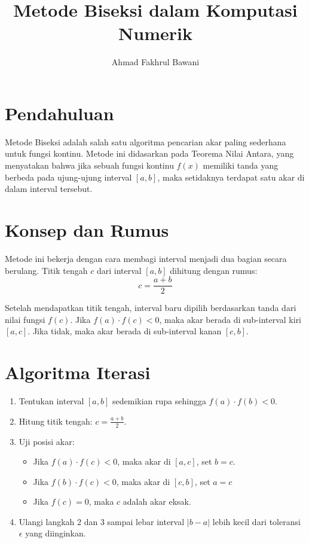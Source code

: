 \documentclass[12pt,a4paper]{article}
\title{Metode Biseksi dalam Komputasi Numerik}
\author{Ahmad Fakhrul Bawani}
\date{}
\begin{document}
\maketitle

\section{Pendahuluan}
Metode Biseksi adalah salah satu algoritma pencarian akar paling sederhana untuk fungsi kontinu. Metode ini didasarkan pada Teorema Nilai Antara, yang menyatakan bahwa jika sebuah fungsi kontinu $f(x)$ memiliki tanda yang berbeda pada ujung-ujung interval $[a, b]$, maka setidaknya terdapat satu akar di dalam interval tersebut.

\section{Konsep dan Rumus}
Metode ini bekerja dengan cara membagi interval menjadi dua bagian secara berulang. Titik tengah $c$ dari interval $[a, b]$ dihitung dengan rumus:
\begin{equation}
c = \frac{a + b}{2}
\end{equation}

Setelah mendapatkan titik tengah, interval baru dipilih berdasarkan tanda dari nilai fungsi $f(c)$. Jika $f(a) \cdot f(c) < 0$, maka akar berada di sub-interval kiri $[a, c]$. Jika tidak, maka akar berada di sub-interval kanan $[c, b]$.

\section{Algoritma Iterasi}
\begin{enumerate}
  \item Tentukan interval $[a, b]$ sedemikian rupa sehingga $f(a) \cdot f(b) < 0$.
  \item Hitung titik tengah: $c = \frac{a + b}{2}$.
  \item Uji posisi akar:
  \begin{itemize}
    \item Jika $f(a) \cdot f(c) < 0$, maka akar di $[a, c]$, set $b = c$.
    \item Jika $f(b) \cdot f(c) < 0$, maka akar di $[c, b]$, set $a = c$
    \item Jika $f(c) = 0$, maka $c$ adalah akar eksak.
  \end{itemize}
  \item Ulangi langkah 2 dan 3 sampai lebar interval $|b - a|$ lebih kecil dari toleransi $\epsilon$ yang diinginkan.
\end{enumerate}
\end{document}

